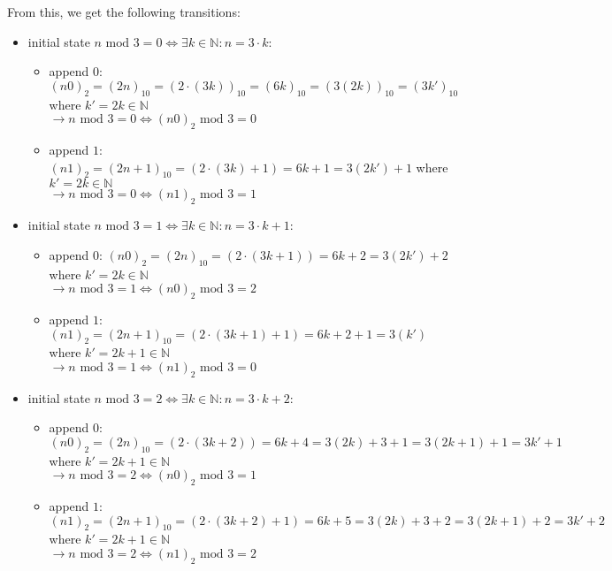 From this, we get the following transitions:
\begin{itemize}
    \item initial state $n \text{ mod } 3 = 0 \Leftrightarrow \exists k \in \mathbb{N}: n = 3\cdot k$:
    \begin{itemize}
        \item append $0$: $(n0)_{2} = (2n)_{10} = (2\cdot(3k))_{10} = (6k)_{10} = (3(2k))_{10} = (3k')_{10}$
        where $k'=2k \in \mathbb{N}$\\
        $\rightarrow n \text{ mod } 3 = 0 \Leftrightarrow (n0)_{2} \text{ mod } 3 = 0$
        \item append $1$: $(n1)_{2} = (2n+1)_{10} = (2\cdot(3k)+1) = 6k+1 = 3(2k')+1$
        where $k'=2k \in \mathbb{N}$\\
        $\rightarrow n \text{ mod } 3 = 0 \Leftrightarrow (n1)_{2} \text{ mod } 3 = 1$
    \end{itemize}
    \item initial state $n \text{ mod } 3 = 1 \Leftrightarrow \exists k \in \mathbb{N}: n = 3\cdot k + 1$:
    \begin{itemize}
        \item append $0$: $(n0)_{2} = (2n)_{10} = (2\cdot(3k+1)) = 6k+2 = 3(2k')+2$
        where $k'=2k \in \mathbb{N}$\\
        $\rightarrow n \text{ mod } 3 = 1 \Leftrightarrow (n0)_{2} \text{ mod } 3 = 2$
        \item append $1$: $(n1)_{2} = (2n+1)_{10} = (2\cdot(3k+1)+1) = 6k+2+1 = 3(k')$
        where $k'=2k+1 \in \mathbb{N}$\\
        $\rightarrow n \text{ mod } 3 = 1 \Leftrightarrow (n1)_{2} \text{ mod } 3 = 0$
    \end{itemize}
    \item initial state $n \text{ mod } 3 = 2 \Leftrightarrow \exists k \in \mathbb{N}: n = 3\cdot k + 2$:
    \begin{itemize}
        \item append $0$: $(n0)_{2} = (2n)_{10} = (2\cdot(3k+2)) = 6k+4 = 3(2k)+3+1 = 3(2k+1)+1 = 3k'+1$
        where $k' = 2k+1\in \mathbb{N}$\\
        $\rightarrow n \text{ mod } 3 = 2 \Leftrightarrow (n0)_{2} \text{ mod } 3 = 1$
        \item append $1$: $(n1)_{2} = (2n+1)_{10} = (2\cdot(3k+2)+1) = 6k+5 = 3(2k)+3+2 = 3(2k+1)+2 = 3k'+2$
        where $k'=2k+1 \in \mathbb{N}$\\
        $\rightarrow n \text{ mod } 3 = 2 \Leftrightarrow (n1)_{2} \text{ mod } 3 = 2$
    \end{itemize}
\end{itemize}

